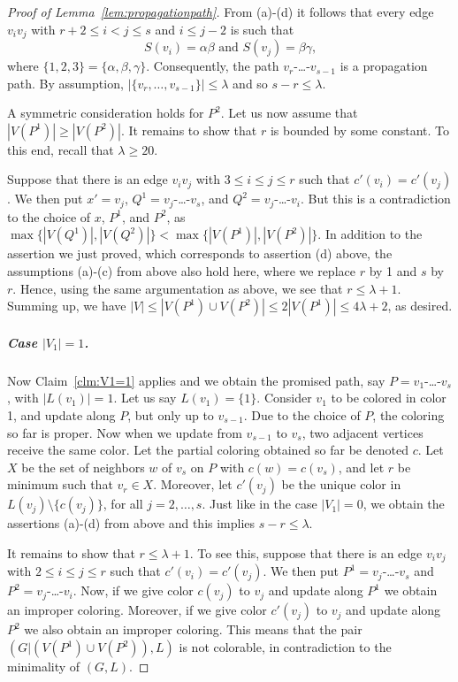 \documentclass[11pt]{article}
\begin{document}
\begin{proof}[Proof of Lemma~\ref{lem:propagationpath}]
From (a)-(d) it follows that every edge $v_iv_j$ with $r+2 \le i < j \le s$ and $i \le j-2$ is such that 
\begin{equation}\label{eqn:conditions2}
\mbox{$S(v_i)=\alpha\beta$ and $S(v_j)=\beta\gamma$,} 
\end{equation}
where $\{1,2,3\} = \{\alpha,\beta,\gamma\}$.
Consequently, the path $v_r$-\ldots-$v_{s-1}$ is a propagation path.
By assumption, $|\{v_r,\ldots,v_{s-1}\}| \le \lambda$ and so $s-r \le \lambda$.

A symmetric consideration holds for $P^2$.
Let us now assume that $|V(P^1)| \ge |V(P^2)|$.
It remains to show that $r$ is bounded by some constant.
To this end, recall that $\lambda \ge 20$.

Suppose that there is an edge $v_iv_j$ with $3 \le i \le j\le r$ such that $c'(v_i) = c'(v_j)$.
We then put $x'=v_j$, $Q^1=v_j$-\ldots-$v_s$, and $Q^2=v_j$-\ldots-$v_i$.
But this is a contradiction to the choice of $x$, $P^1$, and $P^2$, as $\max\{|V(Q^1)|,|V(Q^2)|\}<\max\{|V(P^1)|,|V(P^2)|\}$.
In addition to the assertion we just proved, which corresponds to assertion (d) above, the assumptions (a)-(c) from above also hold here, where we replace $r$ by 1 and $s$ by $r$.
Hence, using the same argumentation as above, we see that $r\le \lambda+1$.
Summing up, we have $|V| \le |V(P^1) \cup V(P^2)| \le 2 |V(P^1)| \le 4\lambda+2$, as desired.

\subparagraph{Case $|V_1|=1$.}
Now Claim~\ref{clm:V1=1} applies and we obtain the promised path, say $P=v_1$-\ldots-$v_s$, with $|L(v_1)|=1$.
Let us say $L(v_1)=\{1\}$.
Consider $v_1$ to be colored in color 1, and update along $P$, but only up to $v_{s-1}$.
Due to the choice of $P$, the coloring so far is proper.
Now when we update from $v_{s-1}$ to $v_s$, two adjacent vertices receive the same color.
Let the partial coloring obtained so far be denoted $c$.
Let $X$ be the set of neighbors $w$ of $v_s$ on $P$ with $c(w)=c(v_s)$, and let $r$ be minimum such that $v_r \in X$.
Moreover, let $c'(v_j)$ be the unique color in $L(v_j)\setminus \{c(v_j)\}$, for all $j=2,\ldots,s$.
Just like in the case $|V_1|=0$, we obtain the assertions (a)-(d) from above and this implies $s-r\le \lambda$.

It remains to show that $r\le \lambda+1$.
To see this, suppose that there is an edge $v_iv_j$ with $2 \le i \le j\le r$ such that $c'(v_i) = c'(v_j)$.
We then put $P^1=v_j$-\ldots-$v_s$ and $P^2=v_j$-\ldots-$v_i$.
Now, if we give color $c(v_j)$ to $v_j$ and update along $P^1$ we obtain an improper coloring.
Moreover, if we give color $c'(v_j)$ to $v_j$ and update along $P^2$ we also obtain an improper coloring.
This means that the pair $(G|(V(P^1)\cup V(P^2)),L)$ is not colorable, in contradiction to the minimality of $(G,L)$.


\end{proof}
\end{document}

